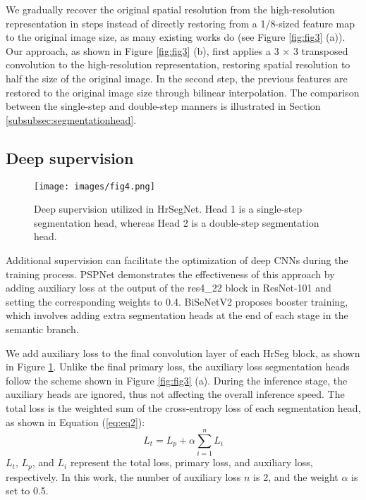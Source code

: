 \documentclass[preprint,12pt,authoryear]{elsarticle}
\begin{document}
We gradually recover the original spatial resolution from the high-resolution representation in steps instead of directly restoring from a 1/8-sized feature map to the original image size, as many existing works do (see Figure \ref{fig:fig3} (a)). Our approach, as shown in Figure \ref{fig:fig3} (b), first applies a 3 × 3 transposed convolution to the high-resolution representation, restoring spatial resolution to half the size of the original image. In the second step, the previous features are restored to the original image size through bilinear interpolation. The comparison between the single-step and double-step manners is illustrated in Section \ref{subsubsec:segmentationhead}. 




\subsection{Deep supervision}
\label{subsec:Deep supervision}

\begin{figure}[t]
    \centering
    \texttt{[image: images/fig4.png]}
    \caption{Deep supervision utilized in HrSegNet. Head 1 is a single-step segmentation head, whereas Head 2 is a double-step segmentation head.}
    \label{fig:fig4}
\end{figure}

Additional supervision can facilitate the optimization of deep CNNs during the training process. PSPNet \citep{zhao2017pyramid} demonstrates the effectiveness of this approach by adding auxiliary loss at the output of the res4\_22 block in ResNet-101 and setting the corresponding weights to 0.4. BiSeNetV2 \citep{yu_bisenet_2020} proposes booster training, which involves adding extra segmentation heads at the end of each stage in the semantic branch. 

We add auxiliary loss to the final convolution layer of each HrSeg block, as shown in Figure \ref{fig:fig4}. Unlike the final primary loss, the auxiliary loss segmentation heads follow the scheme shown in Figure \ref{fig:fig3} (a). During the inference stage, the auxiliary heads are ignored, thus not affecting the overall inference speed. The total loss is the weighted sum of the cross-entropy loss of each segmentation head, as shown in Equation (\ref{eq:eq2}):
\begin{equation}
    L_t = L_p + \alpha \sum_{i=1}^n L_i
    \label{eq:eq2}
\end{equation}
\(L_t\), \(L_p\), and \(L_i\) represent the total loss, primary loss, and auxiliary loss, respectively. In this work, the number of auxiliary loss $n$ is 2, and the weight $\alpha$ is set to 0.5.
\end{document}
